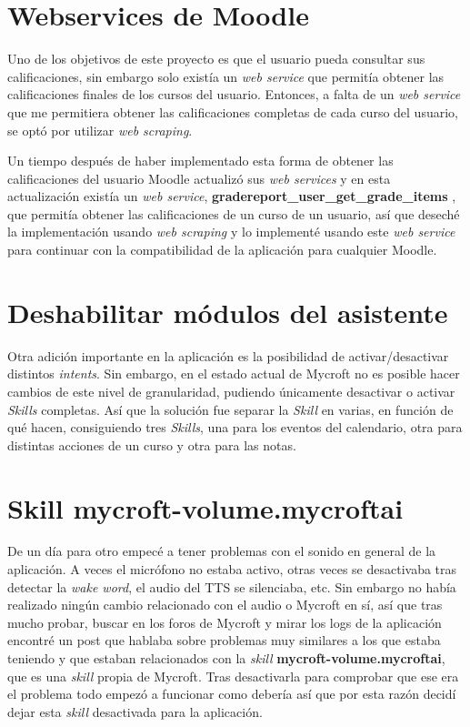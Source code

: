 \section{Webservices de Moodle}

Uno de los objetivos de este proyecto es que el usuario pueda consultar sus calificaciones, sin embargo solo existía un \textit{web service} que permitía obtener las calificaciones finales de los cursos del usuario. Entonces, a falta de un \textit{web service} que me permitiera obtener las calificaciones completas de cada curso del usuario, se optó por utilizar \textit{web scraping}.

Un tiempo después de haber implementado esta forma de obtener las calificaciones del usuario Moodle actualizó sus \textit{web services} y en esta actualización existía un \textit{web service}, \textbf{gradereport\_user\_get\_grade\_items} \cite{MDL64298GradereportUser}, que permitía obtener las calificaciones de un curso de un usuario, así que deseché la implementación usando \textit{web scraping} y lo implementé usando este \textit{web service} para continuar con la compatibilidad de la aplicación para cualquier Moodle.

\section{Deshabilitar módulos del asistente}

Otra adición importante en la aplicación es la posibilidad de activar/desactivar distintos \textit{intents}. Sin embargo, en el estado actual de Mycroft no es posible hacer cambios de este nivel de granularidad, pudiendo únicamente desactivar o activar \textit{Skills} completas. Así que la solución fue separar la \textit{Skill} en varias, en función de qué hacen, consiguiendo tres \textit{Skills}, una para los eventos del calendario, otra para distintas acciones de un curso y otra para las notas.

\section{Skill mycroft-volume.mycroftai}

De un día para otro empecé a tener problemas con el sonido en general de la aplicación. A veces el micrófono no estaba activo, otras veces se desactivaba tras detectar la \textit{wake word}, el audio del TTS se silenciaba, etc. Sin embargo no había realizado ningún cambio relacionado con el audio o Mycroft en sí, así que tras mucho probar, buscar en los foros de Mycroft y mirar los logs de la aplicación encontré un post que hablaba sobre problemas muy similares a los que estaba teniendo y que estaban relacionados con la \textit{skill} \textbf{mycroft-volume.mycroftai}, que es una \textit{skill} propia de Mycroft. Tras desactivarla para comprobar que ese era el problema todo empezó a funcionar como debería así que por esta razón decidí dejar esta \textit{skill} desactivada para la aplicación.